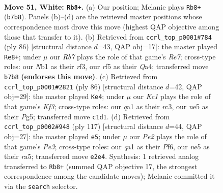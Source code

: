 \documentclass[11pt]{article}
\begin{document}
\clearpage

\begin{figure}[p]\centering
\begin{subfigure}{0.46\textwidth}\centering
\resizebox{\linewidth}{!}{%
\newchessgame
\chessboard[
  setfen={3k4/pR5p/8/4nr2/1p1p4/8/4P3/qNK5 w - - 0 51},
  showmover=false,
  pgfstyle=straightmove, color=movearrow, markmove={b7-b8}
]}
\caption{}
\end{subfigure}\hfill
\begin{subfigure}{0.46\textwidth}\centering
\resizebox{\linewidth}{!}{%
\newchessgame
\chessboard[
  setfen={6k1/1p2R1p1/7p/1P1p4/Q2N2q1/5r2/7K/8 w - - 4 44},
  showmover=false,
  pgfstyle=straightmove, color=movearrow, markmove={e7-e8}
]}
\caption{}
\end{subfigure}
\\[4pt]
\begin{subfigure}{0.46\textwidth}\centering
\resizebox{\linewidth}{!}{%
\newchessgame
\chessboard[
  setfen={4k3/R7/2p3p1/4p1P1/8/p1r1NK2/8/8 w - - 1 44},
  showmover=false,
  pgfstyle=straightmove, color=movearrow, markmove={f3-e4}
]}
\caption{}
\end{subfigure}\hfill
\begin{subfigure}{0.46\textwidth}\centering
\resizebox{\linewidth}{!}{%
\newchessgame
\chessboard[
  setfen={6k1/8/4pp2/R5N1/6n1/1P2P3/Pr6/4K3 b - - 0 59},
  showmover=false,
  pgfstyle=straightmove, color=movearrow, markmove={e6-e5}
]}
\caption{}
\end{subfigure}
\caption{\textbf{Move 51, White: \texttt{Rb8+}.} (a) Our position; Melanie plays \texttt{Rb8+} (\texttt{b7b8}). Panels (b)--(d) are the retrieved master positions whose correspondence most drove this move (highest QAP objective among those that transfer to it). (b) Retrieved from \texttt{ccrl\_top\_p0001\#784} (ply 86) [structural distance $d$=43, QAP obj=17]: the master played \texttt{Re8+}; under $\mu$ our \emph{Rb7} plays the role of that game's \emph{Re7}; cross-type roles: our \emph{N}b1 as their \emph{r}f3, our \emph{r}f5 as their \emph{Q}a4; transferred move \texttt{b7b8} \textbf{(endorses this move)}. (c) Retrieved from \texttt{ccrl\_top\_p0001\#2821} (ply 86) [structural distance $d$=42, QAP obj=29]: the master played \texttt{Ke4}; under $\mu$ our \emph{Kc1} plays the role of that game's \emph{Kf3}; cross-type roles: our \emph{q}a1 as their \emph{r}c3, our \emph{n}e5 as their \emph{P}g5; transferred move \texttt{c1d1}. (d) Retrieved from \texttt{ccrl\_top\_p0002\#948} (ply 117) [structural distance $d$=44, QAP obj=27]: the master played \texttt{e5}; under $\mu$ our \emph{Pe2} plays the role of that game's \emph{Pe3}; cross-type roles: our \emph{q}a1 as their \emph{P}f6, our \emph{n}e5 as their \emph{r}a5; transferred move \texttt{e2e4}. Synthesis: 1 retrieved analog transferred to \texttt{Rb8+} (summed QAP objective 17, the strongest correspondence among the candidate moves); Melanie committed it via the \texttt{search} selector.}
\label{fig:thought-m100}
\end{figure}
\end{document}
